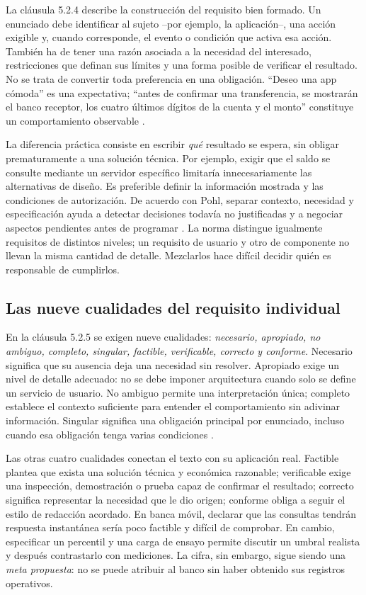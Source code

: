 \documentclass[conference,a4paper]{IEEEtran}
\begin{document}
La cláusula 5.2.4 describe la construcción del requisito bien formado. Un enunciado debe identificar al sujeto --por ejemplo, la aplicación--, una acción exigible y, cuando corresponde, el evento o condición que activa esa acción. También ha de tener una razón asociada a la necesidad del interesado, restricciones que definan sus límites y una forma posible de verificar el resultado. No se trata de convertir toda preferencia en una obligación. ``Deseo una app cómoda'' es una expectativa; ``antes de confirmar una transferencia, se mostrarán el banco receptor, los cuatro últimos dígitos de la cuenta y el monto'' constituye un comportamiento observable \cite[cl.~5.2.4]{iso29148}.

La diferencia práctica consiste en escribir \emph{qué} resultado se espera, sin obligar prematuramente a una solución técnica. Por ejemplo, exigir que el saldo se consulte mediante un servidor específico limitaría innecesariamente las alternativas de diseño. Es preferible definir la información mostrada y las condiciones de autorización. De acuerdo con Pohl, separar contexto, necesidad y especificación ayuda a detectar decisiones todavía no justificadas y a negociar aspectos pendientes antes de programar \cite{pohl2025}. La norma distingue igualmente requisitos de distintos niveles; un requisito de usuario y otro de componente no llevan la misma cantidad de detalle. Mezclarlos hace difícil decidir quién es responsable de cumplirlos.

\subsection{Las nueve cualidades del requisito individual}
En la cláusula 5.2.5 se exigen nueve cualidades: \emph{necesario, apropiado, no ambiguo, completo, singular, factible, verificable, correcto y conforme}. Necesario significa que su ausencia deja una necesidad sin resolver. Apropiado exige un nivel de detalle adecuado: no se debe imponer arquitectura cuando solo se define un servicio de usuario. No ambiguo permite una interpretación única; completo establece el contexto suficiente para entender el comportamiento sin adivinar información. Singular significa una obligación principal por enunciado, incluso cuando esa obligación tenga varias condiciones \cite[cl.~5.2.5]{iso29148}.

Las otras cuatro cualidades conectan el texto con su aplicación real. Factible plantea que exista una solución técnica y económica razonable; verificable exige una inspección, demostración o prueba capaz de confirmar el resultado; correcto significa representar la necesidad que le dio origen; conforme obliga a seguir el estilo de redacción acordado. En banca móvil, declarar que las consultas tendrán respuesta instantánea sería poco factible y difícil de comprobar. En cambio, especificar un percentil y una carga de ensayo permite discutir un umbral realista y después contrastarlo con mediciones. La cifra, sin embargo, sigue siendo una \emph{meta propuesta}: no se puede atribuir al banco sin haber obtenido sus registros operativos.
\end{document}
